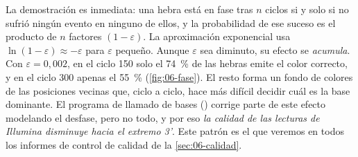 \begin{simbolos}
\end{simbolos}

La demostración es inmediata: una hebra está en fase tras $n$ ciclos si y solo si no sufrió ningún evento en ninguno de ellos, y la probabilidad de ese suceso es el producto de $n$ factores $(1-\varepsilon)$. La aproximación exponencial usa $\ln(1-\varepsilon)\approx-\varepsilon$ para $\varepsilon$ pequeño. Aunque $\varepsilon$ sea diminuto, su efecto se \emph{acumula}. Con $\varepsilon=0{,}002$, en el ciclo 150 solo el \SI{74}{\percent} de las hebras emite el color correcto, y en el ciclo 300 apenas el \SI{55}{\percent} (\cref{fig:06-fase}). El resto forma un fondo de colores de las posiciones vecinas que, ciclo a ciclo, hace más difícil decidir cuál es la base dominante. El programa de llamado de bases () corrige parte de este efecto modelando el desfase, pero no todo, y por eso \emph{la calidad de las lecturas de Illumina disminuye hacia el extremo 3'}. Este patrón es el que veremos en todos los informes de control de calidad de la \cref{sec:06-calidad}.

